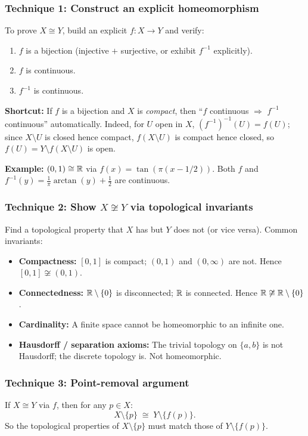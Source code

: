 \documentclass{article}
\begin{document}
\subsubsection*{Technique 1: Construct an explicit homeomorphism}
To prove $X \cong Y$, build an explicit $f : X \to Y$ and verify:
\begin{enumerate}
  \item $f$ is a bijection (injective $+$ surjective, or exhibit
    $f^{-1}$ explicitly).
  \item $f$ is continuous.
  \item $f^{-1}$ is continuous.
\end{enumerate}
\textbf{Shortcut:} If $f$ is a bijection and $X$ is \emph{compact},
then ``$f$ continuous $\Rightarrow$ $f^{-1}$ continuous'' automatically.
Indeed, for $U$ open in $X$, $(f^{-1})^{-1}(U) = f(U)$; since $X
\setminus U$ is closed hence compact, $f(X \setminus U)$ is compact
hence closed, so $f(U) = Y \setminus f(X \setminus U)$ is open.

\textbf{Example:} $(0,1) \cong \mathbb{R}$ via $f(x) = \tan(\pi(x - 1/2))$.
Both $f$ and $f^{-1}(y) = \frac{1}{\pi}\arctan(y) + \frac{1}{2}$ are
continuous.

\subsubsection*{Technique 2: Show $X \not\cong Y$ via topological invariants}
Find a topological property that $X$ has but $Y$ does not (or vice
versa). Common invariants:
\begin{itemize}
  \item \textbf{Compactness:} $[0,1]$ is compact; $(0,1)$ and $(0,\infty)$
    are not. Hence $[0,1] \not\cong (0,1)$.
  \item \textbf{Connectedness:} $\mathbb{R} \setminus \{0\}$ is disconnected;
    $\mathbb{R}$ is connected. Hence $\mathbb{R} \not\cong \mathbb{R} \setminus \{0\}$.
  \item \textbf{Cardinality:} A finite space cannot be homeomorphic to an
    infinite one.
  \item \textbf{Hausdorff / separation axioms:} The trivial topology on
    $\{a,b\}$ is not Hausdorff; the discrete topology is. Not homeomorphic.
\end{itemize}

\subsubsection*{Technique 3: Point-removal argument}
If $X \cong Y$ via $f$, then for any $p \in X$:
\[
  X \setminus \{p\} \;\cong\; Y \setminus \{f(p)\}.
\]
So the topological properties of $X \setminus \{p\}$ must match those of
$Y \setminus \{f(p)\}$.
\end{document}
